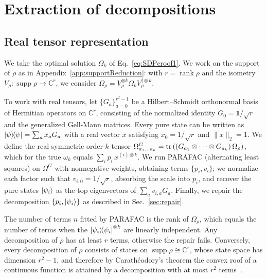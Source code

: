 \documentclass[11pt,a4paper]{report}
\newcommand{\one}{\mathds{1}}
\newcommand{\I}{\one}
\newcommand{\C}{\mathds{C}}
\newcounter{reptag}
\newif\iftags \tagsfalse   %
\newcommand{\reptagbox}[3]{\iftags\par\smallskip\noindent\refstepcounter{reptag}%
  \fcolorbox{#1}{#1!7}{\parbox{\dimexpr\linewidth-2\fboxsep-2\fboxrule\relax}{\small
  \textcolor{#1}{\textbf{[\thereptag]\ #2.}}\ #3}}\par\smallskip\fi}
\newcommand{\detail}[1]{\reptagbox{tagD}{More detail}{#1}}
\newcommand{\deeper}[1]{\reptagbox{tagP}{Deeper proof}{#1}}
\begin{document}
\chapter{Extraction of decompositions}\label{app:extraction}

\section{Real tensor representation}\label{app:tensor}
We take the optimal solution $\Omega_k$ of Eq.~\eqref{eq:SDPcroof1}. We work on the support of $\rho$ as in Appendix~\ref{app:supportReduction}: with $r=\operatorname{rank}\rho$ and the isometry $V_\rho:\operatorname{supp}\rho\to\C^r$, we consider $\Omega_\rho=V_\rho^{\otimes k}\Omega_kV_\rho^{\dagger\otimes k}$.

To work with real tensors, let $\{G_a\}_{a=0}^{r^2-1}$ be a Hilbert--Schmidt orthonormal basis of Hermitian operators on $\C^r$, consisting of the normalized identity $G_0=\I/\sqrt r$ and the generalized Gell-Mann matrices. Every pure state can be written as $\dyad{\psi}=\sum_ax_aG_a$ with a real vector $x$ satisfying $x_0=1/\sqrt r$ and $\|x\|_2=1$. We define the real symmetric order-$k$ tensor $\Omega^G_{a_1\dots a_k}=\tr\left((G_{a_1}\otimes\dots\otimes G_{a_k})\,\Omega_\rho\right)$, which for the true $\omega_k$ equals $\sum_ip_i\,x^{(i)\otimes k}$. We run PARAFAC (alternating least squares) on $\Omega^G$ with nonnegative weights, obtaining terms $\{p_i,v_i\}$; we normalize each factor such that $v_{i,0}=1/\sqrt r$, absorbing the scale into $p_i$, and recover the pure states $\ket{\psi_i}$ as the top eigenvectors of $\sum_av_{i,a}G_a$. Finally, we repair the decomposition $\{p_i,\ket{\psi_i}\}$ as described in Sec.~\ref{sec:repair}.

The number of terms $n$ fitted by PARAFAC is the rank of $\Omega_\rho$, which equals the number of terms when the $\dyad{\psi_i}^{\otimes k}$ are linearly independent.
Any decomposition of $\rho$ has at least $r$ terms, otherwise the repair fails. Conversely, every decomposition of $\rho$ consists of states on $\operatorname{supp}\rho\cong\C^r$, whose state space has dimension $r^2-1$, and therefore by Carath\'eodory's theorem the convex roof of a continuous function is attained by a decomposition with at most $r^2$ terms~\cite[Lemma~A-2]{Uhlmann1998}.
\detail{Background on tensor decompositions: CP rank; why matrix decompositions are not unique but order-3 tensor decompositions are (Kruskal's condition with $k$-ranks); Jennrich's algorithm step by step (two random contractions, simultaneous diagonalisation, read off the factors); alternating least squares for PARAFAC; a toy example (two qubits, a three-term decomposition recovered exactly from $\omega_3$). The negative result that TensorLy's PARAFAC only converged with Jennrich initialisation belongs here too.}
\deeper{Write out the Carath\'eodory count: the graph of the function over the $(r^2-1)$-dimensional state space lives in dimension $r^2$, which gives $r^2+1$ points, and the optimum lies on the boundary of the convex hull, which removes one. This is the same $M=r^2$ as in Sec.~\ref{app:HJW}.}
\end{document}
